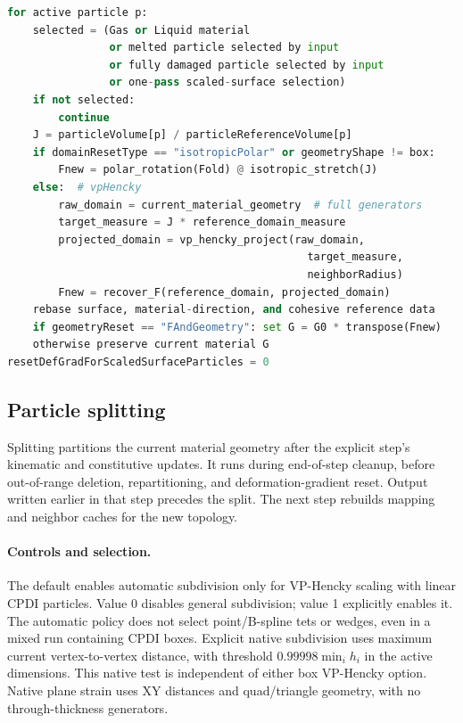\begin{lstlisting}[language=Python,caption={Deformation-gradient reset selection and dispatch.}]
for active particle p:
    selected = (Gas or Liquid material
                or melted particle selected by input
                or fully damaged particle selected by input
                or one-pass scaled-surface selection)
    if not selected:
        continue
    J = particleVolume[p] / particleReferenceVolume[p]
    if domainResetType == "isotropicPolar" or geometryShape != box:
        Fnew = polar_rotation(Fold) @ isotropic_stretch(J)
    else:  # vpHencky
        raw_domain = current_material_geometry  # full generators
        target_measure = J * reference_domain_measure
        projected_domain = vp_hencky_project(raw_domain,
                                               target_measure,
                                               neighborRadius)
        Fnew = recover_F(reference_domain, projected_domain)
    rebase surface, material-direction, and cohesive reference data
    if geometryReset == "FAndGeometry": set G = G0 * transpose(Fnew)
    otherwise preserve current material G
resetDefGradForScaledSurfaceParticles = 0
\end{lstlisting}

\subsection{Particle splitting}
\label{subsec:robust-particle-splitting}

Splitting partitions the current material geometry after the explicit step's
kinematic and constitutive updates. It runs during end-of-step cleanup, before
out-of-range deletion, repartitioning, and deformation-gradient reset. Output
written earlier in that step precedes the split. The next step rebuilds mapping
and neighbor caches for the new topology.

\paragraph{Controls and selection.}
The default  enables automatic subdivision only
for VP-Hencky scaling with linear CPDI particles. Value 0 disables general
subdivision; value 1 explicitly enables it. The automatic policy does not
select point/B-spline tets or wedges, even in a mixed run containing CPDI boxes.
Explicit native subdivision uses maximum current vertex-to-vertex distance,
with threshold $0.99998\min_i h_i$ in the active dimensions. This native test
is independent of either box VP-Hencky option. Native plane strain uses XY distances and quad/triangle geometry, with no
through-thickness generators.

